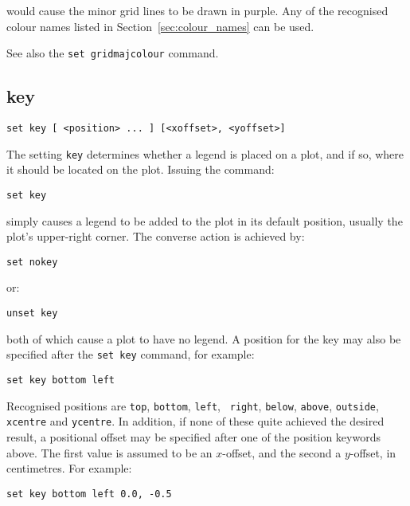 \noindent would cause the minor grid lines to be drawn in purple. Any of the recognised
colour names listed in Section~\ref{sec:colour_names} can be used.

See also the {\tt set gridmajcolour} command.

\subsection{key}

\begin{verbatim}
set key [ <position> ... ] [<xoffset>, <yoffset>]
\end{verbatim}

The setting {\tt key} determines whether a legend is placed on a plot, and if
so, where it should be located on the plot. Issuing the command:

\begin{verbatim}
set key
\end{verbatim}

\noindent simply causes a legend to be added to the plot in its default position, usually
the plot's upper-right corner. The converse action is achieved by:

\begin{verbatim}
set nokey
\end{verbatim}

\noindent or:

\begin{verbatim}
unset key
\end{verbatim}

\noindent both of which cause a plot to have no legend. A position for the key may also
be specified after the {\tt set key} command, for example:

\begin{verbatim}
set key bottom left
\end{verbatim}

Recognised positions are {\tt top}, {\tt bottom}, {\tt left}, {\tt
right}, {\tt below}, {\tt above}, {\tt outside}, {\tt xcentre} and
{\tt ycentre}. In addition, if none of these quite achieved the desired
result, a positional offset may be specified after one of the position keywords
above.  The first value is assumed to be an $x$-offset, and the second a
$y$-offset, in centimetres.  For example:

\begin{verbatim}
set key bottom left 0.0, -0.5
\end{verbatim}

